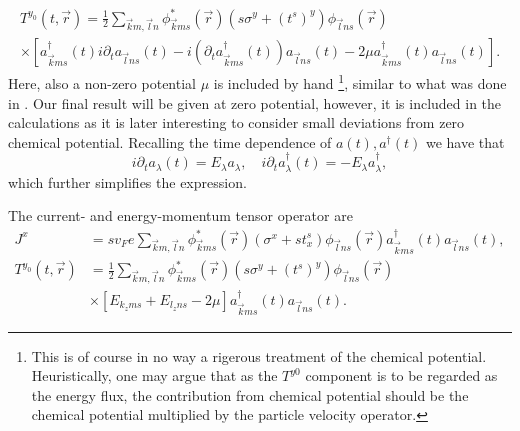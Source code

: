 \begin{multline}
    T^{y_0}(t, \vec{r}) =
    \frac{1}{2}
    \sum\limits_{\vec{k} m, \vec{l} n}^{}
    \phi ^{*}_{\vec{k} m s}(\vec{r}) (s \sigma^y + (t^s)^y) \phi _{\vec{l} n s }(\vec{r})\\
    \times \left[
      a^{\dagger}_{\vec{k} m s}(t) i \partial_t  a_{\vec{l} n s}(t)
      -
      i \left(\partial_t a^{\dagger}_{\vec{k} ms }(t) \right) a_{\vec{l} n s}(t)
      -  2\mu  a^{\dagger}_{\vec{k} m s}(t) a_{\vec{l} n s}(t)
        \right].
\end{multline}
Here, also a non-zero potential $\mu $ is included by hand%
\footnote{This is of course in no way a rigerous treatment of the chemical potential. Heuristically, one may argue that as the \( T^{y0} \) component is to be regarded as the energy flux, the contribution from chemical potential should be the chemical potential multiplied by the particle velocity operator. },%
similar to what was done in \textcite{arjonaFingerprintsConformalAnomaly2019}.
Our final result will be given at zero potential, however, it is included in the calculations as it is later interesting to consider small deviations from zero chemical potential.
Recalling the time dependence of $a(t), a^{\dagger}(t)$ we have that
\[
  i \partial_t a_{\lambda }(t) = E_{\lambda }a_{\lambda },
  \quad
  i \partial_t a^{\dagger}_{\lambda }(t) = -E_{\lambda }a^{\dagger}_{\lambda },
\]
which further simplifies the expression.

\begin{summary}
  The current- and energy-momentum tensor operator are
  \begin{align}
    J^x &= sv_F e \sum\limits_{\vec{k}m, \vec{l}n}^{}
          \phi _{\vec{k}ms}^{*}(\vec{r}) \left(\sigma^x + s t^s_x\right) \phi _{\vec{l}ns}(\vec{r})
          a_{\vec{k}ms}^{\dagger}(t)
          a_{\vec{l}ns}(t),\\
    T^{y_0}(t, \vec{r}) &=
                          \frac{1}{2}
                          \sum\limits_{\vec{k} m, \vec{l} n}^{}
                          \phi ^{*}_{\vec{k} m s}(\vec{r}) (s \sigma^y + (t^s)^y) \phi _{\vec{l} n s }(\vec{r})\\
\nonumber        &\times \left[
                   E_{k_z m s} + E_{l_z n s} - 2\mu \right]
                   a^{\dagger}_{\vec{k} m s}(t)  a_{\vec{l} n s}(t).
  \end{align}
\end{summary}

